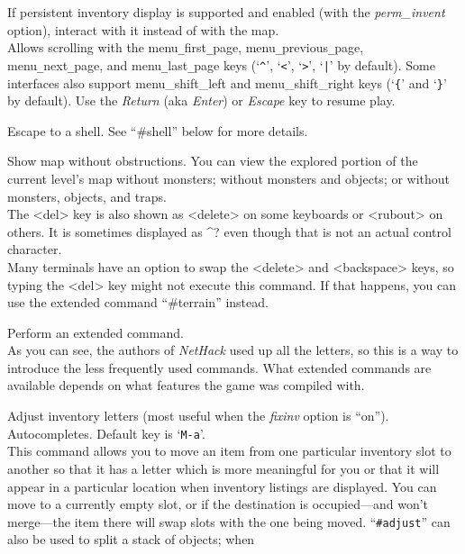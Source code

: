 \item[\tb{|}]
If persistent inventory display is supported and enabled (with the
{\it perm_invent\/}
option), interact with it instead of with the map.
\\
Allows scrolling with the
menu\verb+_+first\verb+_+page, menu\verb+_+previous\verb+_+page,
menu\verb+_+next\verb+_+page, and menu\verb+_+last\verb+_+page
keys (`{\tt \^{}}', `{\tt <}', `{\tt >}', `{\tt \verb+|+}' by default).
Some interfaces also support menu_shift_left and menu_shift_right
keys (`{\tt \verb+{+}' and `{\tt \verb+}+}' by default).
Use the {\it Return\/} (aka {\it Enter\/}) or {\it Escape\/} key to
resume play.

\item[\tb{!}]
Escape to a shell.
See ``\#shell'' below for more details.
\item[\tb{Del}]
Show map without obstructions.
You can view the explored portion of the current level's map without
monsters; without monsters and objects; or without monsters, objects,
and traps.\\
The <del> key is also shown as <delete> on some keyboards or <rubout>
on others.
It is sometimes displayed as \^{}? even though that is not an actual
control character.\\
Many terminals have an option to swap the <delete> and <backspace> keys,
so typing the <del> key might not execute this command.
If that happens, you can use the extended command ``\#terrain'' instead.
\item[\tb{\#}]
Perform an extended command.\\
As you can see, the authors of {\it NetHack\/}
used up all the letters, so this is a way to introduce the less frequently
used commands.
What extended commands are available depends on what features
the game was compiled with.
\item[\tb{\#adjust}]
Adjust inventory letters (most useful when the
{\it fixinv\/}
option is ``on''). Autocompletes. Default key is `{\tt M-a}'.\\
This command allows you to move an item from one particular inventory
slot to another so that it has a letter which is more meaningful for you
or that it will appear in a particular location when inventory listings
are displayed.
You can move to a currently empty slot, or if the destination is
occupied---and won't merge---the
item there will swap slots with the one being moved.
``{\tt \#adjust}'' can also be used to split a stack of objects; when
